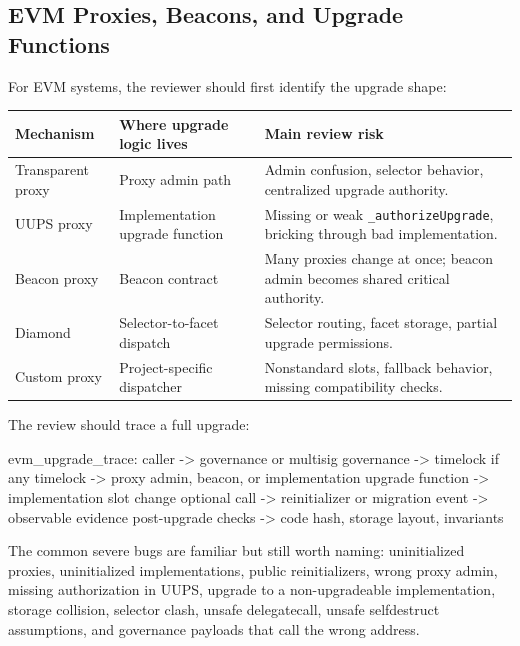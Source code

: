 \subsection{EVM Proxies, Beacons, and Upgrade Functions}

For EVM systems, the reviewer should first identify the upgrade shape:

\begin{table}[htbp]
\centering
\small
\renewcommand{\arraystretch}{1.15}
\begin{tabularx}{\textwidth}{@{}>{\RaggedRight\arraybackslash}p{}>{\RaggedRight\arraybackslash}p{}X@{}}
\toprule
Mechanism & Where upgrade logic lives & Main review risk \\
\midrule
Transparent proxy & Proxy admin path & Admin confusion, selector behavior, centralized upgrade authority. \\
UUPS proxy & Implementation upgrade function & Missing or weak \texttt{\_authorizeUpgrade}, bricking through bad implementation. \\
Beacon proxy & Beacon contract & Many proxies change at once; beacon admin becomes shared critical authority. \\
Diamond & Selector-to-facet dispatch & Selector routing, facet storage, partial upgrade permissions. \\
Custom proxy & Project-specific dispatcher & Nonstandard slots, fallback behavior, missing compatibility checks. \\
\bottomrule
\end{tabularx}
\end{table}

The review should trace a full upgrade:

\begin{codeblock}
evm_upgrade_trace:
    caller -> governance or multisig
    governance -> timelock if any
    timelock -> proxy admin, beacon, or implementation
    upgrade function -> implementation slot change
    optional call -> reinitializer or migration
    event -> observable evidence
    post-upgrade checks -> code hash, storage layout, invariants
\end{codeblock}

The common severe bugs are familiar but still worth naming: uninitialized proxies, uninitialized implementations, public reinitializers, wrong proxy admin, missing authorization in UUPS, upgrade to a non-upgradeable implementation, storage collision, selector clash, unsafe delegatecall, unsafe selfdestruct assumptions, and governance payloads that call the wrong address.

